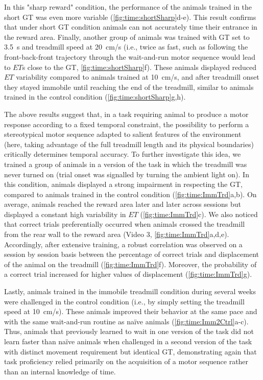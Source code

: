 In this "sharp reward" condition, the performance of the animals trained in the short GT was even more variable (\autoref{fig:time:shortSharp}d-e).
This result confirms that under short GT condition animals can not accurately time their entrance in the reward area.
Finally, another group of animals was trained with GT set to 3.5~s and treadmill speed at 20~cm/s (i.e., twice as fast, such as following the front-back-front trajectory through the wait-and-run motor sequence would lead to $ET$s close to the GT, \autoref{fig:time:shortSharp}f).
These animals displayed reduced $ET$ variability compared to animals trained at 10~cm/s, and after treadmill onset they stayed immobile until reaching the end of the treadmill, similar to animals trained in the control condition (\autoref{fig:time:shortSharp}g,h).
\par

The above results suggest that, in a task requiring animal to produce a motor response according to a fixed temporal constraint, the possibility to perform a stereotypical motor sequence adapted to salient features of the environment (here, taking advantage of the full treadmill length and its physical boundaries) critically determines temporal accuracy.
To further investigate this idea, we trained a group of animals in a version of the task in which the treadmill was never turned on (trial onset was signalled by turning the ambient light on).
In this condition, animals displayed a strong impairment in respecting the GT, compared to animals trained in the control condition (\autoref{fig:time:ImmTrd}a,b).
On average, animals reached the reward area later and later across sessions but displayed a constant high variability in $ET$ (\autoref{fig:time:ImmTrd}c).
We also noticed that correct trials preferentially occurred when animals crossed the treadmill from the rear wall to the reward area (Video 3, \autoref{fig:time:ImmTrd}a,d,e).
Accordingly, after extensive training, a robust correlation was observed on a session by session basis between the percentage of correct trials and displacement of the animal on the treadmill (\autoref{fig:time:ImmTrd}f).
Moreover, the probability of a correct trial increased for higher values of displacement (\autoref{fig:time:ImmTrd}g).
\par

Lastly, animals trained in the immobile treadmill condition during several weeks were challenged in the control condition (i.e., by simply setting the treadmill speed at 10~cm/s).
These animals improved their behavior at the same pace and with the same wait-and-run routine as na\"ive animals (\autoref{fig:time:Imm2Ctrl}a-c).
Thus, animals that previously learned to wait in one version of the task did not learn faster than na\"ive animals when challenged in a second version of the task with distinct movement requirement but identical GT, demonstrating again that task proficiency relied primarily on the acquisition of a motor sequence rather than an internal knowledge of time.